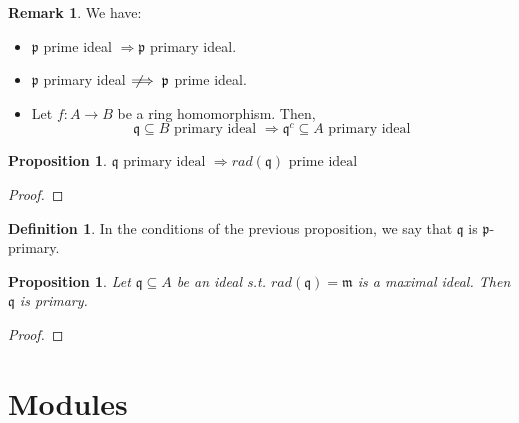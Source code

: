 \documentclass[11pt]{article}
\newtheorem{prop}[theorem]{Proposition}
\theoremstyle{definition}
\newtheorem{defn}[theorem]{Definition}
\newtheorem{rk}[theorem]{Remark}
\newcommand{\notimplies}{\;\not\!\!\!\implies}
\begin{document}
        \begin{rk}
            We have:
            \begin{itemize}
                \item $\mathfrak{p}$ prime ideal $\Longrightarrow \mathfrak{p}$ primary ideal.
                \item $\mathfrak{p}$ primary ideal $\notimplies \mathfrak{p}$ prime ideal.
                \item Let $f: A \longrightarrow B$ be a ring homomorphism.
                Then,
                \[
                    \mathfrak{q} \subseteq B \text{ primary ideal } \Longrightarrow \mathfrak{q}^c \subseteq A \text{ primary ideal}
                \]
            \end{itemize}
        \end{rk}

        \begin{prop}
            $\mathfrak{q} \text{ primary ideal } \Longrightarrow rad(\mathfrak{q}) \text{ prime ideal }$
        \end{prop}
            \begin{proof}


            \end{proof}

        \begin{defn}
            In the conditions of the previous proposition, we say that $\mathfrak{q}$ is $\mathfrak{p}$-primary.
        \end{defn}

        \begin{prop}
            Let $\mathfrak{q} \subseteq A$ be an ideal s.t. $rad(\mathfrak{q}) = \mathfrak{m}$ is a maximal ideal.
            Then $\mathfrak{q}$ is primary.
        \end{prop}
            \begin{proof}


            \end{proof}

    \section{Modules}\label{sec:modules}
\end{document}
